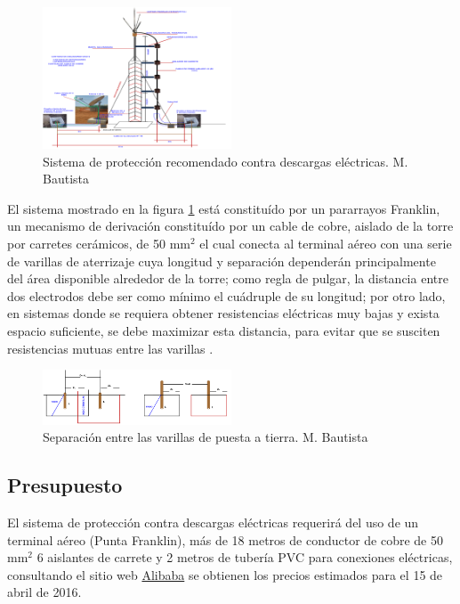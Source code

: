 \documentclass[11pt, a4paper, twosides]{report}
\begin{document}
\begin{figure}[h]
    \centering
    \includegraphics[width=0.5\textwidth]{fig11.png}
    \caption{Sistema de protección recomendado contra descargas eléctricas. M. Bautista}
    \label{fig:11}
\end{figure}

El sistema mostrado en la figura \ref{fig:11} está constituído por un pararrayos Franklin, un mecanismo de derivación constituído por un cable de cobre, aislado de la torre por carretes cerámicos, de 50 mm$^{2}$ el cual conecta al terminal aéreo con una serie de varillas de aterrizaje cuya longitud y separación dependerán principalmente del área disponible alrededor de la torre; como regla de pulgar, la distancia entre dos electrodos debe ser como mínimo el cuádruple de su longitud; por otro lado, en sistemas donde se requiera obtener resistencias eléctricas muy bajas y exista espacio suficiente, se debe maximizar esta distancia, para evitar que se susciten resistencias mutuas entre las varillas \cite{bautista2015}.

\begin{figure}[h]
    \centering
    \includegraphics[width=0.5\textwidth]{fig12.png}
    \caption{Separación entre las varillas de puesta a tierra. M. Bautista}
    \label{fig:12}
\end{figure}

\subsection{Presupuesto}
El sistema de protección contra descargas eléctricas requerirá del uso de un terminal aéreo (Punta Franklin), más de 18 metros de conductor de cobre de 50 mm$^{2}$ 6 aislantes de carrete y 2 metros de tubería PVC para conexiones eléctricas, consultando el sitio web \href{http://alibaba.com}{Alibaba} se obtienen los precios estimados para el 15 de abril de 2016.
\end{document}
